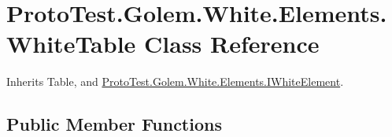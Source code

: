 \hypertarget{class_proto_test_1_1_golem_1_1_white_1_1_elements_1_1_white_table}{\section{Proto\-Test.\-Golem.\-White.\-Elements.\-White\-Table Class Reference}
\label{class_proto_test_1_1_golem_1_1_white_1_1_elements_1_1_white_table}
}


Inherits Table, and \hyperlink{interface_proto_test_1_1_golem_1_1_white_1_1_elements_1_1_i_white_element}{Proto\-Test.\-Golem.\-White.\-Elements.\-I\-White\-Element}.

\subsection*{Public Member Functions}
